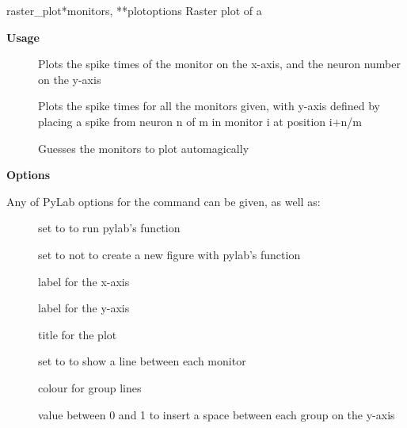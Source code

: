 \documentclass[letterpaper,10pt,english]{manual}
\begin{document}
\hypertarget{brian.raster_plot}{}\begin{funcdesc}{raster\_plot}{*monitors, **plotoptions}
Raster plot of a \hyperlink{brian.SpikeMonitor}{}

\textbf{Usage}
\begin{description}
\item[]
Plots the spike times of the monitor
on the x-axis, and the neuron number on the y-axis

\item[]
Plots the spike times
for all the monitors given, with y-axis defined by placing a spike
from neuron n of m in monitor i at position i+n/m

\item[]
Guesses the monitors to plot automagically

\end{description}

\textbf{Options}

Any of PyLab options for the  command can be given, as well as:
\begin{description}
\item[]
set to  to run pylab's  function

\item[]
set to  not to create a new figure with pylab's  function

\item[]
label for the x-axis

\item[]
label for the y-axis

\item[]
title for the plot

\item[]
set to  to show a line between each monitor

\item[]
colour for group lines

\item[]
value between 0 and 1 to insert a space between
each group on the y-axis

\end{description}
\end{funcdesc}
\end{document}
